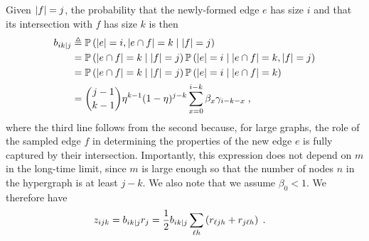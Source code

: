 Given $\left\lvert f \right\rvert=j$, the probability that the newly-formed edge $e$ has size $i$ and that its intersection with $f$ has size $k$ is then 
\begin{align}
    b_{ik|j} &\eqdef \prob{\abs{e} = i, \abs{e \cap f} = k \given \abs{f} = j}  \\ 
    &= \prob{\abs{e \cap f} = k \given \abs{f} = j} \prob{\abs{e} = i \given  \abs{e \cap f} = k,  \abs{f} = j} \\ 
    &= \prob{\abs{e \cap f} = k \given \abs{f} = j} \prob{\abs{e} = i \given  \abs{e \cap f} = k}\\ %
    &= \binom{j-1}{k-1}\eta^{k-1}(1-\eta)^{j-k} \sum_{x = 0}^{i-k} \beta_x \gamma_{i - k - x}\;, \label{eq:bikj}
\end{align}
where the third line follows from the second because, for large graphs, the role of the sampled edge $f$ in determining the properties of the new edge $e$ is fully captured by their intersection.
Importantly, this expression does not depend on $m$ in the long-time limit, since $m$ is large enough so that the number of nodes $n$ in the hypergraph is at least $j - k$. We also note that we assume $\beta_0<1$. 
We therefore have 
\begin{align}
    z_{ijk} &= b_{ik|j} r_j
            = \frac{1}{2} b_{ik|j} \sum_{\ell h} \left(r_{\ell jh } + r_{j \ell h }\right)\;.  \label{eq:zijk}
\end{align}


